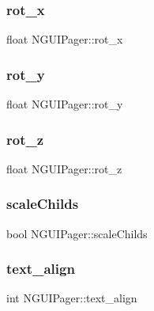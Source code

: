 \subsubsection{\texorpdfstring{rot\+\_\+x}{rot\_x}}
{\footnotesize\ttfamily float N\+G\+U\+I\+Pager\+::rot\+\_\+x}

\hypertarget{class_n_g_u_i_pager_a3ed96b4ba654ae2f6e72dd54898e78f8}{}\label{class_n_g_u_i_pager_a3ed96b4ba654ae2f6e72dd54898e78f8} 
\subsubsection{\texorpdfstring{rot\+\_\+y}{rot\_y}}
{\footnotesize\ttfamily float N\+G\+U\+I\+Pager\+::rot\+\_\+y}

\hypertarget{class_n_g_u_i_pager_a434734ebe879c403266aa483aecfaf53}{}\label{class_n_g_u_i_pager_a434734ebe879c403266aa483aecfaf53} 
\subsubsection{\texorpdfstring{rot\+\_\+z}{rot\_z}}
{\footnotesize\ttfamily float N\+G\+U\+I\+Pager\+::rot\+\_\+z}

\hypertarget{class_n_g_u_i_pager_a227efe928987b4493deed56adbab6e9b}{}\label{class_n_g_u_i_pager_a227efe928987b4493deed56adbab6e9b} 
\subsubsection{\texorpdfstring{scale\+Childs}{scaleChilds}}
{\footnotesize\ttfamily bool N\+G\+U\+I\+Pager\+::scale\+Childs}

\hypertarget{class_n_g_u_i_pager_a09dfba1588a0fb91565e44035580929c}{}\label{class_n_g_u_i_pager_a09dfba1588a0fb91565e44035580929c} 
\subsubsection{\texorpdfstring{text\+\_\+align}{text\_align}}
{\footnotesize\ttfamily int N\+G\+U\+I\+Pager\+::text\+\_\+align}

